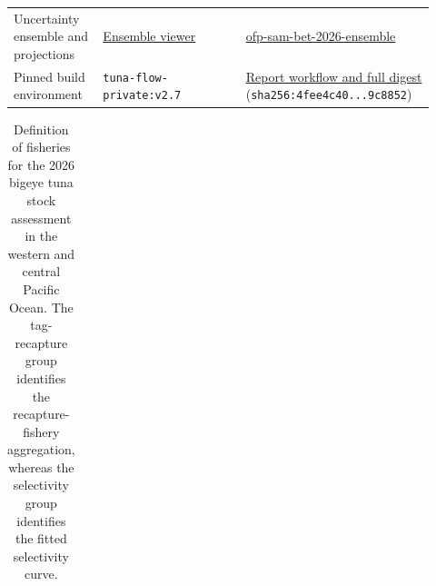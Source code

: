 \documentclass[
  english,
  a4paper,
  a4paper,
  11pt]{SCreport}
\begin{document}
\begin{longtable}{@{}>{\raggedright\arraybackslash}p{0.20\linewidth}>{\raggedright\arraybackslash}p{0.32\linewidth}>{\raggedright\arraybackslash}p{0.40\linewidth}@{}}
Uncertainty ensemble and projections & \href{https://pacificcommunity.github.io/ofp-sam-bet-2026-ensemble/bet-2026-ensemble-interactive-viewer.html}{Ensemble viewer} & \href{https://github.com/PacificCommunity/ofp-sam-bet-2026-ensemble}{ofp-sam-bet-2026-ensemble} \\
Pinned build environment & \texttt{tuna-flow-private:v2.7} & \href{https://github.com/PacificCommunity/ofp-sam-bet-2026-report/blob/rev1/.github/workflows/render-quarto.yml}{Report workflow and full digest} (\texttt{sha256:4fee4c40...9c8852}) \\

\end{longtable}

\endgroup

\clearpage

\begin{landscape}
\begingroup
\fontsize{6.8}{7.2}\selectfont
\setlength{\tabcolsep}{3pt}
\renewcommand{\arraystretch}{0.94}

\begin{longtable}{@{}>{\raggedleft\arraybackslash}p{0.04\linewidth}>{\raggedright\arraybackslash}p{0.18\linewidth}>{\raggedleft\arraybackslash}p{0.04\linewidth}>{\raggedright\arraybackslash}p{0.08\linewidth}>{\raggedleft\arraybackslash}p{0.09\linewidth}>{\raggedleft\arraybackslash}p{0.09\linewidth}>{\raggedright\arraybackslash}p{0.12\linewidth}>{\raggedleft\arraybackslash}p{0.05\linewidth}@{}}

\caption{\label{tbl-fisheries-definitions}Definition of fisheries for the 2026 bigeye tuna stock assessment in the western and central Pacific Ocean. The tag-recapture group identifies the recapture-fishery aggregation, whereas the selectivity group identifies the fitted selectivity curve.}

\tabularnewline


\end{longtable}
\end{landscape}
\end{document}
